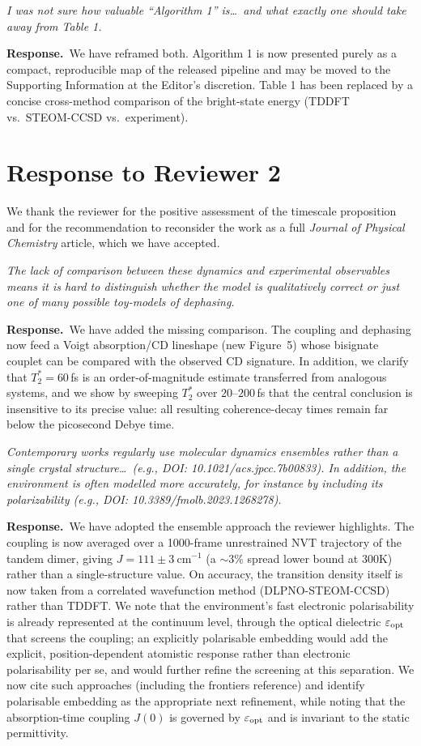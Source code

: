 \documentclass[11pt]{article}
\newcommand{\comment}[1]{\begin{revcomment}\itshape #1\end{revcomment}}
\newcommand{\response}[1]{\noindent\textbf{Response.}\ #1\par\vspace{6pt}}
\begin{document}
\comment{I was not sure how valuable ``Algorithm 1'' is\ldots\ and what exactly one
should take away from Table 1.}

\response{We have reframed both. Algorithm 1 is now presented purely as a compact,
reproducible map of the released pipeline and may be moved to the Supporting
Information at the Editor's discretion. Table 1 has been replaced by a concise
cross-method comparison of the bright-state energy (TDDFT vs.\ STEOM-CCSD vs.\
experiment).}

\newpage
\section*{Response to Reviewer 2}

We thank the reviewer for the positive assessment of the timescale proposition and for
the recommendation to reconsider the work as a full \emph{Journal of Physical
Chemistry} article, which we have accepted.

\comment{The lack of comparison between these dynamics and experimental observables
means it is hard to distinguish whether the model is qualitatively correct or just one
of many possible toy-models of dephasing.}

\response{We have added the missing comparison. The coupling and dephasing now feed a
Voigt absorption/CD lineshape (new Figure~5) whose bisignate couplet can be compared with the observed
CD signature. In addition, we clarify that $T_2^{*}=60$\,fs is an order-of-magnitude
estimate transferred from analogous systems, and we show by sweeping $T_2^{*}$ over
$20$--$200$\,fs that the central conclusion is insensitive to its precise value: all
resulting coherence-decay times remain far below the picosecond Debye time.}

\comment{Contemporary works regularly use molecular dynamics ensembles rather than a
single crystal structure\ldots\ (e.g., DOI: 10.1021/acs.jpcc.7b00833). In addition,
the environment is often modelled more accurately, for instance by including its
polarizability (e.g., DOI: 10.3389/fmolb.2023.1268278).}

\response{We have adopted the ensemble approach the reviewer highlights. The coupling
is now averaged over a 1000-frame unrestrained NVT trajectory of the tandem dimer, giving
$J = 111 \pm 3~\mathrm{cm^{-1}}$ (a $\sim3\%$ spread lower bound at 300K) rather than a single-structure
value. On accuracy, the transition density itself is now taken from a correlated
wavefunction method (DLPNO-STEOM-CCSD) rather than TDDFT. We note that the environment's fast electronic polarisability is already represented
at the continuum level, through the optical dielectric $\varepsilon_{\rm opt}$ that screens the
coupling; an explicitly polarisable embedding would add the explicit, position-dependent
atomistic response rather than electronic polarisability per se, and would further refine
the screening at this separation. We now
cite such approaches (including the frontiers reference) and identify polarisable
embedding as the appropriate next refinement, while noting that the absorption-time
coupling $J(0)$ is governed by $\varepsilon_{\rm opt}$ and is invariant to the static
permittivity.}
\end{document}
